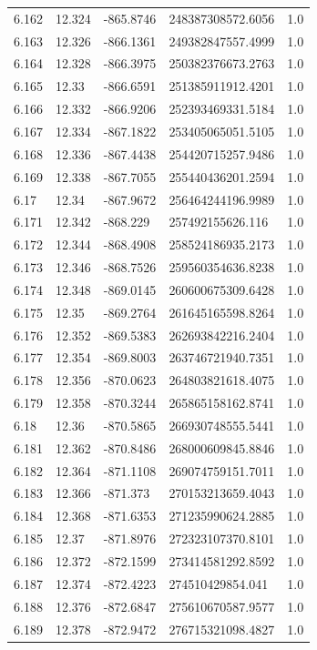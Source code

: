 \begin{tabular}{lllll}
6.162 & 12.324 & -865.8746 & 248387308572.6056 & 1.0 \\
6.163 & 12.326 & -866.1361 & 249382847557.4999 & 1.0 \\
6.164 & 12.328 & -866.3975 & 250382376673.2763 & 1.0 \\
6.165 & 12.33 & -866.6591 & 251385911912.4201 & 1.0 \\
6.166 & 12.332 & -866.9206 & 252393469331.5184 & 1.0 \\
6.167 & 12.334 & -867.1822 & 253405065051.5105 & 1.0 \\
6.168 & 12.336 & -867.4438 & 254420715257.9486 & 1.0 \\
6.169 & 12.338 & -867.7055 & 255440436201.2594 & 1.0 \\
6.17 & 12.34 & -867.9672 & 256464244196.9989 & 1.0 \\
6.171 & 12.342 & -868.229 & 257492155626.116 & 1.0 \\
6.172 & 12.344 & -868.4908 & 258524186935.2173 & 1.0 \\
6.173 & 12.346 & -868.7526 & 259560354636.8238 & 1.0 \\
6.174 & 12.348 & -869.0145 & 260600675309.6428 & 1.0 \\
6.175 & 12.35 & -869.2764 & 261645165598.8264 & 1.0 \\
6.176 & 12.352 & -869.5383 & 262693842216.2404 & 1.0 \\
6.177 & 12.354 & -869.8003 & 263746721940.7351 & 1.0 \\
6.178 & 12.356 & -870.0623 & 264803821618.4075 & 1.0 \\
6.179 & 12.358 & -870.3244 & 265865158162.8741 & 1.0 \\
6.18 & 12.36 & -870.5865 & 266930748555.5441 & 1.0 \\
6.181 & 12.362 & -870.8486 & 268000609845.8846 & 1.0 \\
6.182 & 12.364 & -871.1108 & 269074759151.7011 & 1.0 \\
6.183 & 12.366 & -871.373 & 270153213659.4043 & 1.0 \\
6.184 & 12.368 & -871.6353 & 271235990624.2885 & 1.0 \\
6.185 & 12.37 & -871.8976 & 272323107370.8101 & 1.0 \\
6.186 & 12.372 & -872.1599 & 273414581292.8592 & 1.0 \\
6.187 & 12.374 & -872.4223 & 274510429854.041 & 1.0 \\
6.188 & 12.376 & -872.6847 & 275610670587.9577 & 1.0 \\
6.189 & 12.378 & -872.9472 & 276715321098.4827 & 1.0 \\

\end{tabular}
